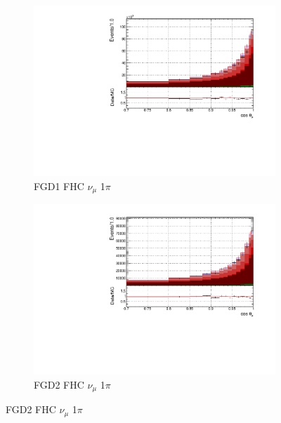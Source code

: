 \begin{figure}[!htbp]
\begin{subfigure}{0.49\textwidth}
  \centering
  \includegraphics[width=\textwidth]{figs/FGD1_numuCC_1pi_t}
  \caption{FGD1 FHC $\nu_{\mu}$ 1$\pi$}
\end{subfigure}
\centering
\begin{subfigure}{0.49\textwidth}
  \centering
  \includegraphics[width=\textwidth]{figs/FGD2_numuCC_1pi_t}
  \caption{FGD2 FHC $\nu_{\mu}$ 1$\pi$}
\end{subfigure}


\end{figure}
